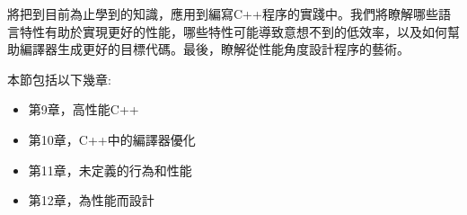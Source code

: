 
將把到目前為止學到的知識，應用到編寫C++程序的實踐中。我們將瞭解哪些語言特性有助於實現更好的性能，哪些特性可能導致意想不到的低效率，以及如何幫助編譯器生成更好的目標代碼。最後，瞭解從性能角度設計程序的藝術。

本節包括以下幾章:

\begin{itemize}
\item 第9章，高性能C++
\item 第10章，C++中的編譯器優化
\item 第11章，未定義的行為和性能
\item 第12章，為性能而設計
\end{itemize}

